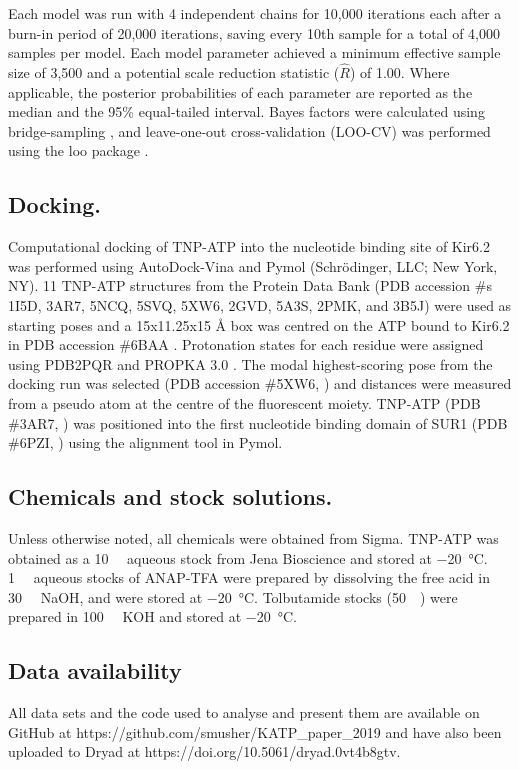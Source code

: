 \documentclass[10pt,lineno, doublespacing]{elife}
\begin{document}
Each model was run with 4 independent chains for 10,000 iterations each after a burn-in period of 20,000 iterations, saving every 10th sample for a total of 4,000 samples per model.
Each model parameter achieved a minimum effective sample size of 3,500 and a potential scale reduction statistic ($\hat{R}$) of 1.00.
Where applicable, the posterior probabilities of each parameter are reported as the median and the 95\% equal-tailed interval.
Bayes factors were calculated using bridge-sampling \citep{RN104}, and leave-one-out cross-validation (LOO-CV) was performed using the loo package \citep{RN110}.

\subsection{Docking.}
Computational docking of TNP-ATP into the nucleotide binding site of Kir6.2 was performed using AutoDock-Vina \citep{RN118} and Pymol (Schrödinger, LLC; New York, NY).
11 TNP-ATP structures from the Protein Data Bank (PDB accession \#s 1I5D, 3AR7, 5NCQ, 5SVQ, 5XW6, 2GVD, 5A3S, 2PMK, and 3B5J) were used as starting poses and a 15x11.25x15 \si{\angstrom} box was centred on the ATP bound to Kir6.2 in PDB accession \#6BAA \citep{RN6}.
Protonation states for each residue were assigned using PDB2PQR and PROPKA 3.0 \citep{RN111}.
The modal highest-scoring pose from the docking run was selected (PDB accession \#5XW6, \cite{RN112}) and distances were measured from a pseudo atom at the centre of the fluorescent moiety.
TNP-ATP (PDB \#3AR7, \cite{RN53}) was positioned into the first nucleotide binding domain of SUR1 (PDB \#6PZI, \cite{RN113}) using the alignment tool in Pymol.

\subsection{Chemicals and stock solutions.}
Unless otherwise noted, all chemicals were obtained from Sigma.
TNP-ATP was obtained as a \SI{10}{\milli\Molar} aqueous stock from Jena Bioscience and stored at \SI{-20}{\degreeCelsius}. \SI{1}{\milli\Molar} aqueous stocks of ANAP-TFA were prepared by dissolving the free acid in \SI{30}{\milli\Molar} NaOH, and were stored at \SI{-20}{\degreeCelsius}. Tolbutamide stocks (\SI{50}{\milli\Molar}) were prepared in \SI{100}{\milli\Molar} KOH and stored at \SI{-20}{\degreeCelsius}.

\subsection{Data availability}
All data sets and the code used to analyse and present them are available on GitHub at \textcolor{elife-blue}{https://github.com/smusher/KATP\_paper\_2019} and have also been uploaded to Dryad at \textcolor{elife-blue}{https://doi.org/10.5061/dryad.0vt4b8gtv}.
\end{document}
